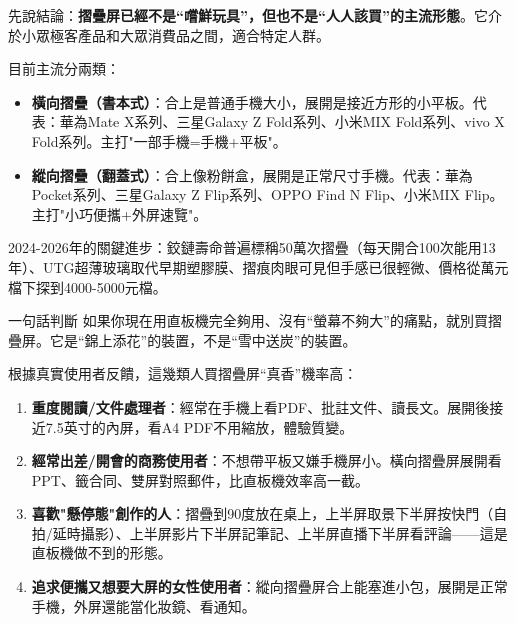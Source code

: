 


先說結論：\textbf{摺疊屏已經不是“嚐鮮玩具”，但也不是“人人該買”的主流形態}。它介於小眾極客產品和大眾消費品之間，適合特定人群。

目前主流分兩類：

\begin{itemize}
  \item \textbf{橫向摺疊（書本式）}：合上是普通手機大小，展開是接近方形的小平板。代表：華為Mate X系列、三星Galaxy Z Fold系列、小米MIX Fold系列、vivo X Fold系列。主打"一部手機=手機+平板"。
  \item \textbf{縱向摺疊（翻蓋式）}：合上像粉餅盒，展開是正常尺寸手機。代表：華為Pocket系列、三星Galaxy Z Flip系列、OPPO Find N Flip、小米MIX Flip。主打"小巧便攜+外屏速覽"。
\end{itemize}

2024-2026年的關鍵進步：鉸鏈壽命普遍標稱50萬次摺疊（每天開合100次能用13年）、UTG超薄玻璃取代早期塑膠膜、摺痕肉眼可見但手感已很輕微、價格從萬元檔下探到4000-5000元檔。

\begin{tcbinfo}{一句話判斷}
如果你現在用直板機完全夠用、沒有“螢幕不夠大”的痛點，就別買摺疊屏。它是“錦上添花”的裝置，不是“雪中送炭”的裝置。

\end{tcbinfo}


根據真實使用者反饋，這幾類人買摺疊屏“真香”機率高：

\begin{enumerate}
  \item \textbf{重度閱讀/文件處理者}：經常在手機上看PDF、批註文件、讀長文。展開後接近7.5英寸的內屏，看A4 PDF不用縮放，體驗質變。
  \item \textbf{經常出差/開會的商務使用者}：不想帶平板又嫌手機屏小。橫向摺疊屏展開看PPT、籤合同、雙屏對照郵件，比直板機效率高一截。
  \item \textbf{喜歡"懸停態"創作的人}：摺疊到90度放在桌上，上半屏取景下半屏按快門（自拍/延時攝影）、上半屏影片下半屏記筆記、上半屏直播下半屏看評論——這是直板機做不到的形態。
  \item \textbf{追求便攜又想要大屏的女性使用者}：縱向摺疊屏合上能塞進小包，展開是正常手機，外屏還能當化妝鏡、看通知。
\end{enumerate}


